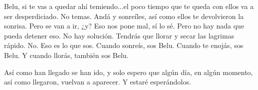 \documentclass[12t, a4 paper]{article}
\begin{document}
Belu, si te vas a quedar ahí temiendo...el poco tiempo que te queda con ellos va a ser desperdiciado. No temas. Andá y sonreíles, así como ellos te devolvieron la sonrisa. Pero se van a ir, ¿y? Eso nos pone mal, sí lo sé. Pero no hay nada que pueda detener eso. No hay solución. Tendrás que llorar y secar las lagrimas rápido. No. Eso es lo que sos. Cuando sonreís, sos Belu. Cuando te enojás, sos Belu. Y cuando llorás, también sos Belu.  

Así como han llegado se han ido, y solo espero que algún día, en algún momento, así como llegaron, vuelvan a aparecer. Y estaré esperándolos. 
\end{document}
